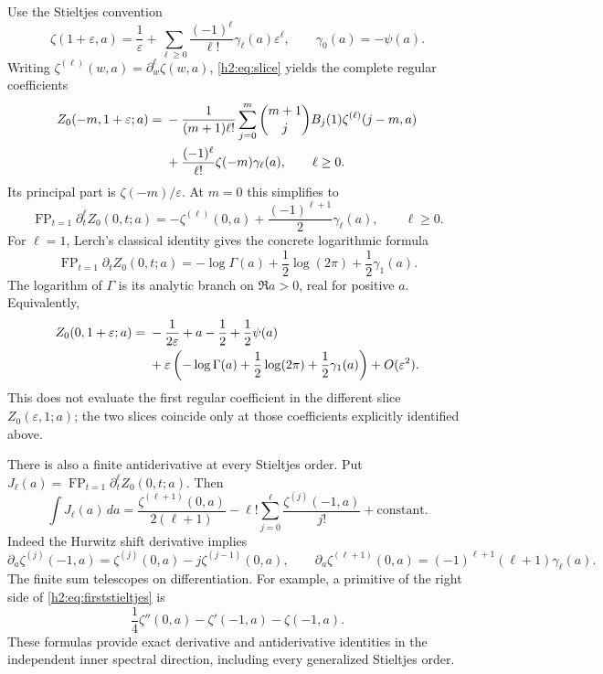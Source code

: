 \documentclass[11pt,a4paper]{article}
\theoremstyle{definition}
\theoremstyle{remark}
\numberwithin{equation}{section}
\begin{document}
Use the Stieltjes convention
\[
 \zeta(1+\varepsilon,a)=\frac1\varepsilon
       +\sum_{\ell\ge0}\frac{(-1)^\ell}{\ell!}
                         \gamma_\ell(a)\varepsilon^\ell,
 \qquad \gamma_0(a)=-\psi(a).
\]
Writing $\zeta^{(\ell)}(w,a)=\partial_w^\ell\zeta(w,a)$,
\eqref{h2:eq:slice} yields the complete regular coefficients
\begin{align}
 [\varepsilon^\ell]Z_0(-m,1+\varepsilon;a)
 ={}&-\frac1{(m+1)\ell!}\sum_{j=0}^{m}
       \binom{m+1}{j}B_j(1)\zeta^{(\ell)}(j-m,a)
       \notag\\
 &+\frac{(-1)^\ell}{\ell!}\zeta(-m)\gamma_\ell(a),
 \qquad \ell\ge0.\label{h2:eq:slicejets}
\end{align}
Its principal part is $\zeta(-m)/\varepsilon$. At $m=0$ this simplifies to
\begin{equation}\label{h2:eq:allstieltjes}
 \boxed{\displaystyle
 \operatorname{FP}_{t=1}\partial_t^\ell Z_0(0,t;a)
   =-\zeta^{(\ell)}(0,a)
           +\frac{(-1)^{\ell+1}}2\gamma_\ell(a),
 \qquad \ell\ge0.}
\end{equation}
For $\ell=1$, Lerch's classical identity
\cite{DLMFHzeta} gives the concrete logarithmic formula
\begin{equation}\label{h2:eq:firststieltjes}
 \boxed{\displaystyle
 \operatorname{FP}_{t=1}\partial_t Z_0(0,t;a)
   =-\log\Gamma(a)+\frac12\log(2\pi)+\frac12\gamma_1(a).}
\end{equation}
The logarithm of $\Gamma$ is its analytic branch on $\Re a>0$,
real for positive $a$. Equivalently,
\begin{align}
 Z_0(0,1+\varepsilon;a)
  ={}&-\frac1{2\varepsilon}+a-\frac12+\frac12\psi(a)\notag\\
  &+\varepsilon\left(-\log\Gamma(a)+\frac12\log(2\pi)
                                     +\frac12\gamma_1(a)\right)
       +O(\varepsilon^2).\label{h2:eq:Z0next}
\end{align}
This does not evaluate the first regular coefficient in the different
slice $Z_0(\varepsilon,1;a)$; the two slices coincide only at those
coefficients explicitly identified above.

There is also a finite antiderivative at every Stieltjes order. Put
$J_\ell(a)=\operatorname{FP}_{t=1}\partial_t^\ell Z_0(0,t;a)$.
Then
\begin{equation}\label{h2:eq:primitive}
 \boxed{\displaystyle
 \int J_\ell(a)\,da
  =\frac{\zeta^{(\ell+1)}(0,a)}{2(\ell+1)}
      -\ell!\sum_{j=0}^{\ell}
                  \frac{\zeta^{(j)}(-1,a)}{j!}
       +\text{constant}.}
\end{equation}
Indeed the Hurwitz shift derivative implies
\[
 \partial_a\zeta^{(j)}(-1,a)
     =\zeta^{(j)}(0,a)-j\zeta^{(j-1)}(0,a),\qquad
 \partial_a\zeta^{(\ell+1)}(0,a)
     =(-1)^{\ell+1}(\ell+1)\gamma_\ell(a).
\]
The finite sum telescopes on differentiation. For example, a primitive
of the right side of \eqref{h2:eq:firststieltjes} is
\[
 \frac14\zeta''(0,a)-\zeta'(-1,a)-\zeta(-1,a).
\]
These formulas provide exact derivative and antiderivative identities
in the independent inner spectral direction, including every
generalized Stieltjes order.
\end{document}
